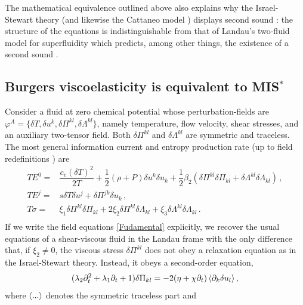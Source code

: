\documentclass[a4paper, amsfonts, amssymb, amsmath, reprint, showkeys, nofootinbib, twoside, onecolumn,notitlepage]{revtex4-1}
\begin{document}
The mathematical equivalence outlined above also explains why the Israel-Stewart theory (and likewise the Cattaneo model \cite{cattaneo1958}) displays second sound \cite{rezzolla_book}: the structure of the equations is indistinguishable from that of Landau's two-fluid model for superfluidity which predicts, among other things, the existence of a second sound \cite{landau6}. 





\subsection{Burgers viscoelasticity is equivalent to MIS$^*$} 

Consider a fluid at zero chemical potential whose perturbation-fields are $\varphi^A=\{\delta T,\delta u^k, \delta \Pi^{kl},\delta \Lambda^{kl}\}$, namely temperature, flow velocity, shear stresses, and an auxiliary two-tensor field. Both $\delta \Pi^{kl}$ and $\delta \Lambda^{kl}$ are symmetric and traceless. The most general information current and entropy production rate (up to field redefinitions \cite{GavassinoNonHydro2022}) are
\begin{equation}\label{infoBurgers}
\begin{split}
TE^0 ={}& \dfrac{c_v (\delta T)^2}{2T} + \dfrac{1}{2}(\rho{+}P)\delta u^k \delta u_k  +\dfrac{1}{2} \beta_2 (\delta \Pi^{kl}\delta \Pi_{kl}+\delta \Lambda^{kl}\delta \Lambda_{kl})\, , \\
TE^j ={}& s  \delta T \delta u^j + \delta \Pi^{jk}\delta u_k \, , \\
T\sigma ={}& \xi_1 \delta \Pi^{kl}\delta \Pi_{kl}+2\xi_2 \delta \Pi^{kl}\delta \Lambda_{kl}+\xi_3\delta \Lambda^{kl}\delta \Lambda_{kl} \, . \\
\end{split}
\end{equation}
If we write the field equations \eqref{Fudamental} explicitly, we recover the usual equations of a shear-viscous fluid in the Landau frame \cite{OlsonLifsh1990} with the only difference that, if $\xi_2 \neq 0$, the viscous stress $\delta \Pi^{kl}$ does not obey a relaxation equation as in the Israel-Stewart theory. Instead, it obeys a second-order equation,  
\begin{equation}\label{burgers}
(\lambda_2 \partial_t^2  + \lambda_1 \partial_t + 1) \delta \Pi_{kl} = - 2(\eta+\chi \partial_t) \braket{\partial_k \delta u_l} ,
\end{equation}
where $\braket{...}$ denotes the symmetric traceless part and
\end{document}
